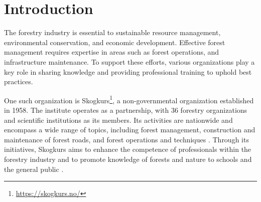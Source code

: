 \chapter{Introduction}\label{chap:introduction}

The forestry industry is essential to sustainable resource management, environmental conservation, and economic development. Effective forest management requires expertise in areas such as forest operations, and infrastructure maintenance. To support these efforts, various organizations play a key role in sharing knowledge and providing professional training to uphold best practices.

One such organization is Skogkurs\footnote{\url{https://skogkurs.no/}}, a non-governmental organization established in 1958. The institute operates as a partnership, with 36 forestry organizations and scientific institutions as its members. Its activities are nationwide and encompass a wide range of topics, including forest management, construction and maintenance of forest roads, and forest operations and techniques \cite{skogkurs_eng}. Through its initiatives, Skogkurs aims to enhance the competence of professionals within the forestry industry and to promote knowledge of forests and nature to schools and the general public \cite{skogkurs_nor}. 

